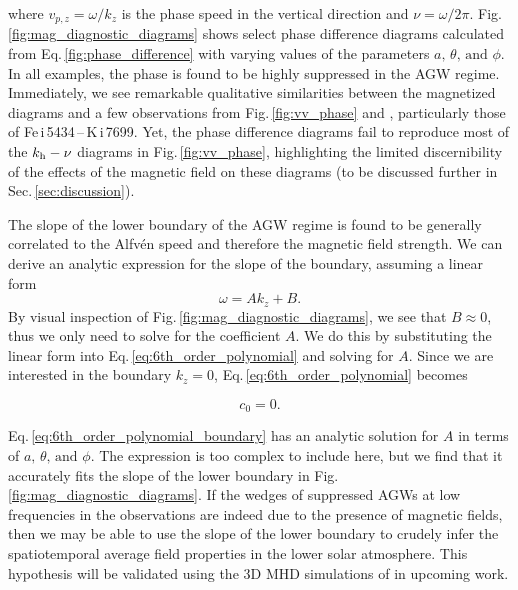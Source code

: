 \documentclass[preprint2,linenumbers]{aastex701}
\newcommand{\IBISFeUpperPhot}[1]{Fe\,{\sc i}\,5434}
\newcommand{\IBISK}[1]{K\,{\sc i}\,7699}
\begin{document}
where $v_{p, z} = \omega/k_z$ is the phase speed in the vertical direction and $\nu = \omega/2\pi$. Fig.\,\ref{fig:mag_diagnostic_diagrams} shows select phase difference diagrams calculated from Eq.\,\ref{fig:phase_difference} with varying values of the parameters $a\text{, }\theta\text{, and } \phi$. In all examples, the phase is found to be highly suppressed in the AGW regime. Immediately, we see remarkable qualitative similarities between the magnetized diagrams and a few observations from Fig.\,\ref{fig:vv_phase} and , particularly those of \IBISFeUpperPhot{}\,--\,\IBISK{}. Yet, the phase difference diagrams fail to reproduce most of the $k_{\rm{h}}-\nu$ diagrams in Fig.\,\ref{fig:vv_phase}, highlighting the limited discernibility of the effects of the magnetic field on these diagrams (to be discussed further in Sec.\,\ref{sec:discussion}).

The slope of the lower boundary of the AGW regime is found to be generally correlated to the Alfv\'{e}n speed and therefore the magnetic field strength. We can derive an analytic expression for the slope of the boundary, assuming a linear form
\begin{equation}
    \omega = A k_z + B.
   \label{eqn:lower_boundary}
\end{equation}
By visual inspection of Fig.\,\ref{fig:mag_diagnostic_diagrams}, we see that $B \approx 0$, thus we only need to solve for the coefficient $A$. We do this by substituting the linear form into Eq.\,\ref{eq:6th_order_polynomial} and solving for $A$. Since we are interested in the boundary $k_z=0$, Eq.\,\ref{eq:6th_order_polynomial} becomes

\begin{equation}
    c_0 = 0.
    \label{eq:6th_order_polynomial_boundary}
\end{equation}

Eq.\,\ref{eq:6th_order_polynomial_boundary} has an analytic solution for $A$ in terms of $a\text{, }\theta\text{, and } \phi$. The expression is too complex to include here, but we find that it accurately fits the slope of the lower boundary in Fig.\,\ref{fig:mag_diagnostic_diagrams}. If the wedges of suppressed AGWs at low frequencies in the observations are indeed due to the presence of magnetic fields, then we may be able to use the slope of the lower boundary to crudely infer the spatiotemporal average field properties in the lower solar atmosphere. This hypothesis will be validated using the 3D MHD simulations of \citet{2017_Vigeesh, 2020_Vigeesh_Roth, 2021_Vigeesh_Roth_Steiner_Fleck} in upcoming work.
\end{document}
